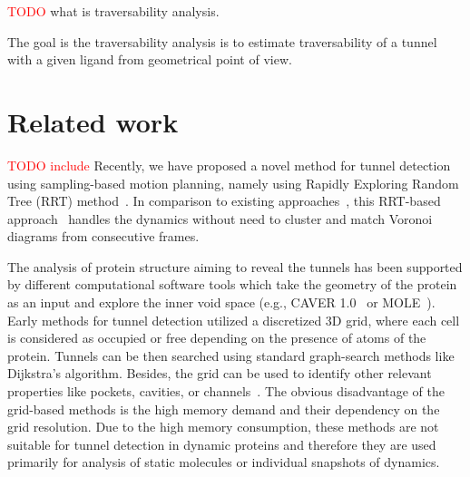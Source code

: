 \documentclass{svmult}
\newcommand{\red}[1]{\textcolor{red}{#1}}
\begin{document}
\red{TODO}
what is traversability analysis.

The goal is the traversability analysis is to estimate traversability of a tunnel with a given ligand from geometrical point of view.



\section{Related work}

\red{TODO include}
Recently, we have proposed a novel method for tunnel detection using sampling-based motion planning, namely using Rapidly Exploring Random Tree (RRT) method~\cite{vonasek2016application}.
In comparison to existing approaches~\cite{Petrek20071357,citeulike:6257975}, this RRT-based approach~\cite{vonasek2016application} 
handles the dynamics without need to cluster and match Voronoi diagrams from consecutive frames.


The analysis of protein structure aiming to reveal the tunnels has been supported by different computational software tools which take the geometry of the protein as an input and explore the inner void space (e.g., CAVER 1.0~\cite{citeulike:6257975} or MOLE~\cite{Petrek20071357}). 
Early methods for tunnel detection utilized a discretized 3D grid, where each cell is considered as occupied or free depending
on the presence of atoms of the protein.
Tunnels can be then searched using standard graph-search methods like Dijkstra's algorithm.
Besides, the grid can be used to identify other relevant properties like 
pockets, cavities, or channels~\cite{sehnal2013mole,citeulike:6257975}.
The obvious disadvantage of the grid-based methods is the high memory demand and their dependency on the grid resolution.
Due to the high memory consumption, these methods are not suitable for tunnel detection in dynamic proteins and therefore they
are used primarily for analysis of static molecules or individual snapshots of dynamics.

\end{document}
